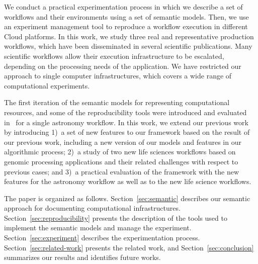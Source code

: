 We conduct a practical experimentation process in which we describe a set 
of workflows and their environments using a set of semantic models. Then, we 
use an experiment management tool to reproduce a workflow execution in different 
Cloud platforms. In this work, we study three real and representative production 
workflows, which have been disseminated in several scientific publications. Many 
scientific workflows allow their execution infrastructure to be escalated, depending on 
the processing needs of the application. We have restricted our approach 
to single computer infrastructures, which covers a wide range of computational 
experiments.






The first iteration of the semantic models for representing computational 
resources, and some of the reproducibility tools were introduced and evaluated 
in~\cite{SantanaPerez-REPPAR-2014} for a single astronomy workflow. In this 
work, we extend our previous work by introducing 1)~a set of new features to 
our framework based on the result of our previous work, including a new 
version of our models and features in our algorithmic process; 2)~a study of 
two new life sciences workflows based on genomic processing applications 
 and their related challenges with respect to previous cases; and 3)~a 
practical evaluation of the framework with the new features for the astronomy 
workflow as well as to the new life science workflows. 


The paper is organized as follows. Section~\ref{sec:semantic} describes our semantic approach 
for documenting computational infrastructures. Section~\ref{sec:reproducibility} presents the 
description of the tools used to implement the semantic models and manage the experiment. 
Section~\ref{sec:experiment} describes the experimentation process. Section~\ref{sec:related-work} 
presents the related work, and Section~\ref{sec:conclusion} summarizes our results and 
identifies future works.


